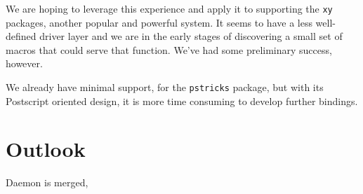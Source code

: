 \documentclass{llncs}
\begin{document}
We are hoping to leverage this experience and apply
it to supporting the \texttt{xy} packages, another
popular and powerful system.  It seems to have a less
well-defined driver layer and we are in the early stages of
discovering a small set of macros that could serve that
function.  We've had some preliminary success, however.

We already have minimal support, for the \texttt{pstricks}
package, but with its Postscript oriented design,
it is more time consuming to develop further bindings.

\section{Outlook}

Daemon is merged, 



\end{document}

